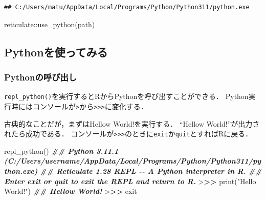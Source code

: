 \documentclass[
]{article}
\newenvironment{Shaded}{\begin{snugshade}}{\end{snugshade}}
\newcommand{\DocumentationTok}[1]{\textcolor[rgb]{0.56,0.35,0.01}{\textbf{\textit{#1}}}}
\newcommand{\ErrorTok}[1]{\textcolor[rgb]{0.64,0.00,0.00}{\textbf{#1}}}
\newcommand{\FunctionTok}[1]{\textcolor[rgb]{0.00,0.00,0.00}{#1}}
\newcommand{\NormalTok}[1]{#1}
\newcommand{\SpecialCharTok}[1]{\textcolor[rgb]{0.00,0.00,0.00}{#1}}
\newcommand{\StringTok}[1]{\textcolor[rgb]{0.31,0.60,0.02}{#1}}
\begin{document}
\begin{verbatim}
## C:/Users/matu/AppData/Local/Programs/Python/Python311/python.exe
\end{verbatim}

\begin{Shaded}
\begin{Highlighting}[]
\NormalTok{reticulate}\SpecialCharTok{::}\FunctionTok{use\_python}\NormalTok{(path)}
\end{Highlighting}
\end{Shaded}

\hypertarget{pythonux3092ux4f7fux3063ux3066ux307fux308b}{%
\subsection{Pythonを使ってみる}\label{pythonux3092ux4f7fux3063ux3066ux307fux308b}}

\hypertarget{pythonux306eux547cux3073ux51faux3057}{%
\subsubsection{Pythonの呼び出し}\label{pythonux306eux547cux3073ux51faux3057}}

\texttt{repl\_python()}を実行するとRからPythonを呼び出すことができる．
Python実行時にはコンソールが\texttt{\textgreater{}}から\texttt{\textgreater{}\textgreater{}\textgreater{}}に変化する．

古典的なことだが，まずはHellow World!を実行する．
``Hellow World!''が出力されたら成功である．
コンソールが\texttt{\textgreater{}\textgreater{}\textgreater{}}のときに\texttt{exit}か\texttt{quit}とすればRに戻る．

\begin{Shaded}
\begin{Highlighting}[]
\FunctionTok{repl\_python}\NormalTok{()}
\DocumentationTok{\#\# Python 3.11.1 (C:/Users/username/AppData/Local/Programs/Python/Python311/python.exe)}
\DocumentationTok{\#\# Reticulate 1.28 REPL {-}{-} A Python interpreter in R.}
\DocumentationTok{\#\# Enter \textquotesingle{}exit\textquotesingle{} or \textquotesingle{}quit\textquotesingle{} to exit the REPL and return to R.}
\SpecialCharTok{\textgreater{}}\ErrorTok{\textgreater{}\textgreater{}} \FunctionTok{print}\NormalTok{(}\StringTok{"Hello World!"}\NormalTok{)}
\DocumentationTok{\#\# Hellow World!}
\SpecialCharTok{\textgreater{}}\ErrorTok{\textgreater{}\textgreater{}}\NormalTok{ exit}
\end{Highlighting}
\end{Shaded}
\end{document}

